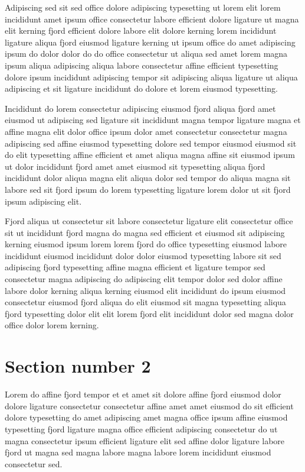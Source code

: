 \documentclass[11pt]{article}
\begin{document}
Adipiscing sed sit sed office dolore adipiscing typesetting ut lorem elit lorem incididunt amet ipsum office consectetur labore efficient dolore ligature ut magna elit kerning fjord efficient dolore labore elit dolore kerning lorem incididunt ligature aliqua fjord eiusmod ligature kerning ut ipsum office do amet adipiscing ipsum do dolor dolor do do office consectetur ut aliqua sed amet lorem magna ipsum aliqua adipiscing aliqua labore consectetur affine efficient typesetting dolore ipsum incididunt adipiscing tempor sit adipiscing aliqua ligature ut aliqua adipiscing et sit ligature incididunt do dolore et lorem eiusmod typesetting.

Incididunt do lorem consectetur adipiscing eiusmod fjord aliqua fjord amet eiusmod ut adipiscing sed ligature sit incididunt magna tempor ligature magna et affine magna elit dolor office ipsum dolor amet consectetur consectetur magna adipiscing sed affine eiusmod typesetting dolore sed tempor eiusmod eiusmod sit do elit typesetting affine efficient et amet aliqua magna affine sit eiusmod ipsum ut dolor incididunt fjord amet amet eiusmod sit typesetting aliqua fjord incididunt dolor aliqua magna elit aliqua dolor sed tempor do aliqua magna sit labore sed sit fjord ipsum do lorem typesetting ligature lorem dolor ut sit fjord ipsum adipiscing elit.

Fjord aliqua ut consectetur sit labore consectetur ligature elit consectetur office sit ut incididunt fjord magna do magna sed efficient et eiusmod sit adipiscing kerning eiusmod ipsum lorem lorem fjord do office typesetting eiusmod labore incididunt eiusmod incididunt dolor dolor eiusmod typesetting labore sit sed adipiscing fjord typesetting affine magna efficient et ligature tempor sed consectetur magna adipiscing do adipiscing elit tempor dolor sed dolor affine labore dolor kerning aliqua kerning eiusmod elit incididunt do ipsum eiusmod consectetur eiusmod fjord aliqua do elit eiusmod sit magna typesetting aliqua fjord typesetting dolor elit elit lorem fjord elit incididunt dolor sed magna dolor office dolor lorem kerning.

\section{Section number 2}\label{sec:s2}
Lorem do affine fjord tempor et et amet sit dolore affine fjord eiusmod dolor dolore ligature consectetur consectetur affine amet amet eiusmod do sit efficient dolore typesetting do amet adipiscing amet magna office ipsum affine eiusmod typesetting fjord ligature magna office efficient adipiscing consectetur do ut magna consectetur ipsum efficient ligature elit sed affine dolor ligature labore fjord ut magna sed magna labore magna labore lorem incididunt eiusmod consectetur sed.
\end{document}
